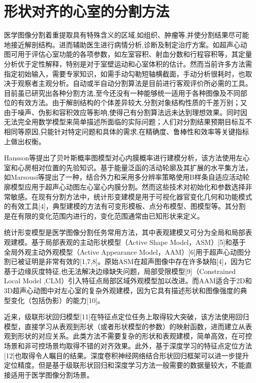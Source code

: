 \chapter{形状对齐的心室的分割方法}
\label{chap:Segmentation}
 
医学图像分割着重提取具有特殊含义的区域,如组织、肿瘤等,并使分割结果尽可能地接近解剖结构。进而辅助医生进行病情分析,诊断及制定治疗方案。如超声心动图可用于评估心室功能的各项参数，如左室容积、射血分数和行程容积等，其定量分析优于定性解释，特别是对于室壁运动和心室体积的估计。然而当前许多方法需指定初始输入，需要专家知识，如需手动勾勒短轴横截面，手动分析很耗时，也取决于观察者主观分析。自动或半自动分割算法是目前进行客观评价所必需的工具。目前虽已研究出各种分割方法,至今还没有一种能够统一适用于各种图像及不同部位的有效方法。由于解剖结构的个体差异较大,分割对象结构性质的千差万别；又由于噪声、伪影和容积效应等影响,使得己有分割算法远未达到理想效果。同时因无法完全用数学模型来简单描述所面临的实际问题；人们对分割结果预期目标互不相同等原因,只能针对特定问题和具体的需求,在精确度、鲁棒性和效率等关键指标上做出权衡\citep{Bosch2002}。

Hansson等\citep{Hansson2014}提出了贝叶斯概率图模型对心内膜概率进行建模分析，该方法使用左心室和心房相对位置的先验知识。基于能量泛函的活动轮廓及其扩展的水平集方法，如Marsousi等\citep{Marsousi2010}提出了一种，结合外力和采用多分辨率策略使用B样条自适应活动轮廓模型应用于超声心动图左心室心内膜分割。然而这些技术对初始化和参数选择非常敏感。在现有分割方法中，统计形变建模是用于可视化器官变化几何和功能模式的有效工具[4]，典型建模的方法有可变形模板、点分布模型、图模型等。其分割是在有限的变化范围内进行的，变化范围通常由已知形状来定义。

统计形变模型是医学图像分割任务常用方法，其中表观建模又可分为全局和局部表观建模。基于局部表观的主动形状模型（Active Shape Model，ASM）[5]和基于全局外观主动外观模型（Active Appearance Model，AAM）[6]用于超声心动图分割已被证明是非常有效的[1,7,8]。原始ASM在超声图像中存在许多缺陷[4]，因为它基于边缘灰度特征,也无法解决边缘缺失问题，局部受限模型[9]（Constrained Local Model ,CLM）引入特征点局部区域外观模型加以改进。而AAM适合于2D和3D超声心动图中对左心室的复杂外观建模，因为它具有描述形状和图像强度的典型变化（包括伪影）的能力[10]。

近来，级联形状回归模型[11]在特征点定位任务上取得较大突破，该方法使用回归模型，直接学习从表观到形状（或者形状模型的参数）的映射函数，进而建立从表观到形状的对应关系。此类方法不需要复杂的形状和表观建模，简单高效，在可控场景和非可控场景均取得不错的对齐效果。此外，基于深度学习的特征点定位方法[12]也取得令人瞩目的结果。深度卷积神经网络结合形状回归框架可以进一步提升定位精度。但是基于级联形状回归和深度学习方法一般需要的数据量较大，不能直接适用于医学图像分割场景。

